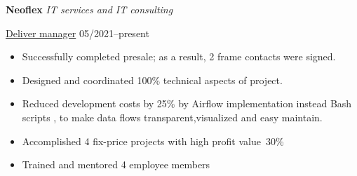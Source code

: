\textbf{Neoflex} \textit{IT services and IT consulting} \par
\underline{Deliver manager} \hfill 05/2021--present
\begin{itemize}
	\item Successfully completed presale; as a result, 2 frame contacts were signed.
 	\item Designed and coordinated 100\% technical aspects of project.
 	\item Reduced development costs by 25\% by Airflow implementation instead Bash scripts ,  to make data flows transparent,visualized and easy maintain.
	\item Accomplished 4 fix-price projects with high profit value~30\%
 	\item Trained and mentored 4 employee members
\end{itemize}\par
